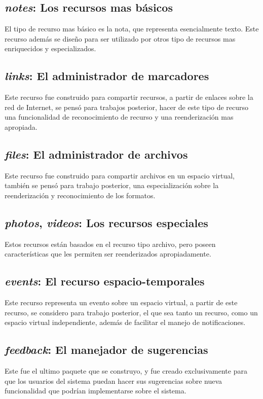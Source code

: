 \subsection{\emph{notes}: Los recursos mas básicos}
El tipo de recurso mas básico es la nota, que representa esencialmente texto.
Este recurso además se diseño para ser utilizado por otros tipo de recursos mas
enriquecidos y especializados.

\subsection{\emph{links}: El administrador de marcadores}
Este recurso fue construido para compartir recursos, a partir de enlaces sobre
la red de Internet, se pensó para trabajos posterior, hacer de este tipo de
recurso una funcionalidad de reconocimiento de recurso y una reenderización mas
apropiada.

\subsection{\emph{files}: El administrador de archivos}
Este recurso fue construido para compartir archivos en un espacio virtual,
también se pensó para trabajo posterior, una especialización sobre la
reenderización y reconocimiento de los formatos.

\subsection{\emph{photos}, \emph{videos}: Los recursos especiales}
Estos recursos están basados en el recurso tipo archivo, pero poseen
características que les permiten ser reenderizados apropiadamente.

\subsection{\emph{events}: El recurso espacio-temporales}
Este recurso representa un evento sobre un espacio virtual, a partir de este
recurso, se considero para trabajo posterior, el que sea tanto un recurso, como
un espacio virtual independiente, además de facilitar el manejo de
notificaciones.

\subsection{\emph{feedback}: El manejador de sugerencias}
Este fue el ultimo paquete que se construyo, y fue creado exclusivamente para
que los usuarios del sistema puedan hacer sus sugerencias sobre nueva
funcionalidad que podrían implementarse sobre el sistema.

